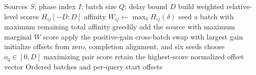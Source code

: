 \begin{algorithm}[t]
  \caption{Sharing-aware batching and bounded start-offset search}
  \label{alg:online-planner}
  \footnotesize
  \begin{algorithmic}[1]
    \Require Sources $S$; phase index $I$; batch size $Q$; delay bound $D$
      \State build weighted relative-level scores $H_{ij}[-D{:}D]$
      \State affinity $W_{ij}\gets\max_{\delta}H_{ij}(\delta)$
    \EndFor
      \State seed a batch with maximum remaining total affinity
      \State greedily add the source with maximum marginal $W$ score
    \EndWhile
    \Repeat
      \State apply the positive-gain cross-batch swap with largest gain
      \State initialize offsets from zero, completion alignment, and six seeds
        \Repeat
           \State choose $o_q\in[0,D]$ maximizing pair score \EndFor
      \EndFor
      \State retain the highest-score normalized offset vector
    \EndFor
    \Ensure Ordered batches and per-query start offsets
  \end{algorithmic}
\end{algorithm}
